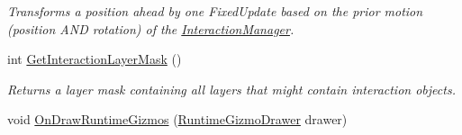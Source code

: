 \begin{DoxyCompactItemize}
\begin{DoxyCompactList}\small\item\em Transforms a position ahead by one Fixed\+Update based on the prior motion (position A\+ND rotation) of the \mbox{\hyperlink{class_leap_1_1_unity_1_1_interaction_1_1_interaction_manager}{Interaction\+Manager}}. \end{DoxyCompactList}\item 
int \mbox{\hyperlink{class_leap_1_1_unity_1_1_interaction_1_1_interaction_manager_ac8f4cc8c3f11fb6f67640072100b7e8a}{Get\+Interaction\+Layer\+Mask}} ()
\begin{DoxyCompactList}\small\item\em Returns a layer mask containing all layers that might contain interaction objects. \end{DoxyCompactList}\item 
void \mbox{\hyperlink{class_leap_1_1_unity_1_1_interaction_1_1_interaction_manager_ad85d00ee53f6c8569a27ffbc1c582724}{On\+Draw\+Runtime\+Gizmos}} (\mbox{\hyperlink{class_leap_1_1_unity_1_1_runtime_gizmos_1_1_runtime_gizmo_drawer}{Runtime\+Gizmo\+Drawer}} drawer)
\end{DoxyCompactItemize}
